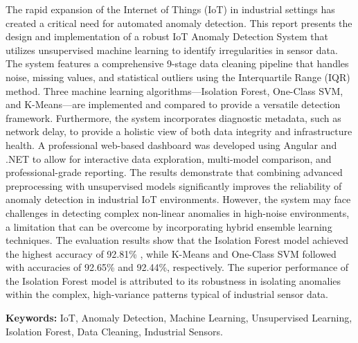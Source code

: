 The rapid expansion of the Internet of Things (IoT) in industrial settings has created a critical need for automated anomaly detection. This report presents the design and implementation of a robust IoT Anomaly Detection System that utilizes unsupervised machine learning to identify irregularities in sensor data. The system features a comprehensive 9-stage data cleaning pipeline that handles noise, missing values, and statistical outliers using the Interquartile Range (IQR) method. Three machine learning algorithms—Isolation Forest, One-Class SVM, and K-Means—are implemented and compared to provide a versatile detection framework. Furthermore, the system incorporates diagnostic metadata, such as network delay, to provide a holistic view of both data integrity and infrastructure health. A professional web-based dashboard was developed using Angular and .NET to allow for interactive data exploration, multi-model comparison, and professional-grade reporting. The results demonstrate that combining advanced preprocessing with unsupervised models significantly improves the reliability of anomaly detection in industrial IoT environments. However, the system may face challenges in detecting complex non-linear anomalies in high-noise environments, a limitation that can be overcome by incorporating hybrid ensemble learning techniques. The evaluation results show that the Isolation Forest model achieved the highest accuracy of 92.81\% , while K-Means and One-Class SVM followed with accuracies of 92.65\% and 92.44\%, respectively. The superior performance of the Isolation Forest model is attributed to its robustness in isolating anomalies within the complex, high-variance patterns typical of industrial sensor data.

\vspace{8pt}
\textbf{Keywords:} IoT, Anomaly Detection, Machine Learning, Unsupervised Learning, Isolation Forest, Data Cleaning, Industrial Sensors.
